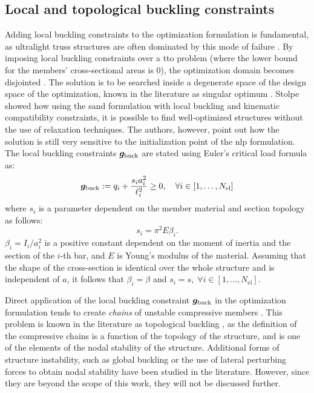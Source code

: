 \subsection{Local and topological buckling constraints}
Adding local buckling constraints to the optimization formulation is fundamental, as ultralight truss structures are often dominated by this mode of failure . By imposing local buckling constraints over a \gls{tto} problem (where the lower bound for the members' cross-sectional areas is 0), the optimization domain becomes disjointed . The solution is to be searched inside a degenerate space of the design space of the optimization, known in the literature as singular optimum . Stolpe  showed how using the \gls{sand} formulation with local buckling and kinematic compatibility constraints, it is possible to find well-optimized structures without the use of relaxation techniques. The authors, however, point out how the solution is still very sensitive to the initialization point of the \gls{nlp} formulation. The local buckling constraints $\bm{g}_{\text{buck}}$ are stated using Euler's critical load formula as:
\begin{equation}
    \bm{g}_{\text{buck}}:=q_i  + \frac{s_i a_i^2}{\ell_i^2} \geq 0, \quad \forall i \in [1,\ldots, N_{\text{el}}]
    \label{eq:04_buck}
\end{equation}
where $s_i$ is a parameter dependent on the member material and section topology as follows:
\begin{equation}
    s_i=\pi^2 E \beta_i.
    \label{eq:04_s}
\end{equation}
$\beta_i=I_i/a^2_i$ is a positive constant dependent on the moment of inertia and the section of the $i$-th bar, and $E$ is Young's modulus of the material. Assuming that the shape of the cross-section is identical over the whole structure and is independent of $a$, it follows that  $\beta_i = \beta$ and $s_i = s, \; \forall i \in [1,\ldots, N_{\text{el}}]$.

Direct application of the local buckling constraint $\bm{g}_{\text{buck}}$ in the optimization formulation tends to create \textit{chains} of unstable compressive members . This problem is known in the literature as topological buckling , as the definition of the compressive chains is a function of the topology of the structure, and is one of the elements of the nodal stability of the structure. Additional forms of structure instability, such as global buckling  or the use of lateral perturbing forces to obtain nodal stability  have been studied in the literature. However, since they are beyond the scope of this work, they will not be discussed further.

